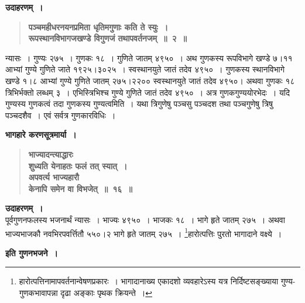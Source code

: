\documentclass[11pt, openany]{book}
\begin{document}
\newpage

\begin{sloppypar}
\noindent \textbf{उदाहरणम्~।}

 \label{Ex 1.2}
\begin{quote}
\textbf{{\color{red}पञ्चमहीधरनयनप्रमिता धृतिमगुणाः कति ते स्युः~।\\ 
रूपस्थानविभागजखण्डे विगुणजं तथापवर्तनजम्~॥~२~॥}}
\end{quote}

न्यासः~। गुण्यः २७५~। गुणकः १८~। गुणिते जातम् ४९५०~। अथ गुणकस्य रूपविभागे खण्डे ७।११ आभ्यां गुण्ये गुणिते जाते १९२५।३०२५~। स्वस्थानयुते जातं तदेव ४९५०~। गुणकस्य स्थानविभागे खण्डे १।८ आभ्यां गुण्ये गुणिते जातम् २७५।२२०० स्वस्थानयुते जातं तदेव ४९५०। अथवा गुणकः १८ त्रिभिर्भक्तो लब्धम् ३~। एभिस्त्रिभिश्च गुण्ये गुणिते जातं तदेव ४९५०~। अत्र गुणकगुण्ययोरभेदः~। यदि गुण्यस्य गुणकत्वं तदा गुणकस्य गुण्यत्वमिति~। यथा त्रिगुणेषु पञ्चसु पञ्चदश तथा पञ्चगुणेषु त्रिषु पञ्चदशैव~। एवं सर्वत्र गुणकारविधिः~।\\

\begin{center}
\textbf{भागहारे करणसूत्रमार्या~।}
\end{center}
\vspace{-2mm}

 \label{1.16}
\begin{quote}
{\large \textbf{{\color{purple}भाज्यादन्त्याद्धारः \\
शुध्यति येनाहतः फलं तत् स्यात्~।\\ 
अपवर्त्य भाज्यहारौ \\
केनापि समेन वा विभजेत्~॥~१६~॥}}}
\end{quote}

\textbf{उदाहरणम्~।}\\

पूर्वगुणनफलस्य भजनार्थं न्यासः~। भाज्यः ४९५०~। भाजकः १८~। भागे हृते जातम् २७५~। अथवा भाज्यभाजकौ नवभिरपवर्त्तितौ ५५०।२ भागे हृते जातम् २७५~। \renewcommand{\thefootnote}{$\star$}\footnote{हारोत्पत्तिनामापवर्तनान्वेषणप्रकारः~। भागादानाख्य एकादशो व्यवहारेऽस्य यत्र निर्दिष्टसङ्ख्याया गुण्य-गुणकभावापन्ना दृढा अङ्काः पृथक क्रियन्ते~।}हारोत्पत्तिः पुरतो भागादाने वक्ष्ये~।

\begin{center}
\textbf{इति गुणनभजने~।}
\end{center}

\end{sloppypar}

\newpage
\end{document}
